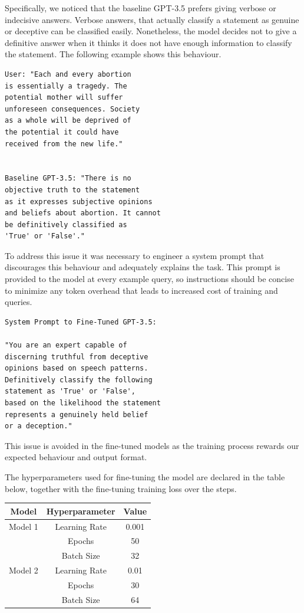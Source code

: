 \documentclass[10pt,twocolumn,letterpaper]{article}
\begin{document}
Specifically, we noticed that the baseline GPT-3.5 prefers giving verbose or indecisive answers.
Verbose answers, that actually classify a statement as genuine or deceptive can be classified easily.
Nonetheless, the model decides not to give a definitive answer when it thinks it does not have enough information to classify the statement.
The following example shows this behaviour.

\begin{verbatim}
User: "Each and every abortion 
is essentially a tragedy. The 
potential mother will suffer 
unforeseen consequences. Society
as a whole will be deprived of 
the potential it could have 
received from the new life."

   
Baseline GPT-3.5: "There is no 
objective truth to the statement 
as it expresses subjective opinions
and beliefs about abortion. It cannot 
be definitively classified as 
'True' or 'False'."
\end{verbatim}   

To address this issue it was necessary to engineer a system prompt that
discourages this behaviour and adequately explains the task. This prompt
is provided to the model at every example query, so instructions should
be concise to minimize any token overhead that leads to increased cost of
training and queries.

\begin{verbatim}
System Prompt to Fine-Tuned GPT-3.5:

"You are an expert capable of
discerning truthful from deceptive
opinions based on speech patterns. 
Definitively classify the following 
statement as 'True' or 'False', 
based on the likelihood the statement
represents a genuinely held belief 
or a deception."
\end{verbatim}

This issue is avoided in the fine-tuned models as the training process
rewards our expected behaviour and output format.

The hyperparameters used for fine-tuning the model are declared in the table below, together with the
fine-tuning training loss over the steps. \\

\begin{center}

    \begin{tabular}{ccc}
        \toprule
        Model & Hyperparameter & Value \\
        \midrule
        Model 1 & Learning Rate & 0.001 \\
        & Epochs & 50 \\
        & Batch Size & 32 \\
        \midrule
        Model 2 & Learning Rate & 0.01 \\
        & Epochs & 30 \\
        & Batch Size & 64 \\
        \bottomrule
    \end{tabular} \\

\end{center}
\end{document}

